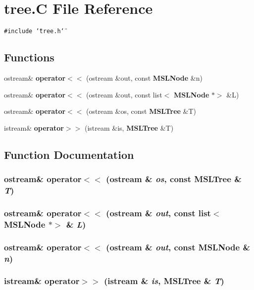 \section{tree.C File Reference}
\label{tree_C}
{\tt \#include \char`\"{}tree.h\char`\"{}}\par
\subsection*{Functions}
\begin{CompactItemize}
\item 
ostream\& {\bf operator$<$$<$} (ostream \&out, const {\bf MSLNode} \&n)
\item 
ostream\& {\bf operator$<$$<$} (ostream \&out, const list$<$ {\bf MSLNode} $\ast$$>$ \&L)
\item 
ostream\& {\bf operator$<$$<$} (ostream \&os, const {\bf MSLTree} \&T)
\item 
istream\& {\bf operator$>$$>$} (istream \&is, {\bf MSLTree} \&T)
\end{CompactItemize}


\subsection{Function Documentation}
\subsubsection{\setlength{\rightskip}{0pt plus 5cm}ostream\& operator$<$$<$ (ostream \& {\em os}, const {\bf MSLTree} \& {\em T})}\label{tree_C_a2}


\subsubsection{\setlength{\rightskip}{0pt plus 5cm}ostream\& operator$<$$<$ (ostream \& {\em out}, const list$<$ {\bf MSLNode} $\ast$$>$ \& {\em L})}\label{tree_C_a1}


\subsubsection{\setlength{\rightskip}{0pt plus 5cm}ostream\& operator$<$$<$ (ostream \& {\em out}, const {\bf MSLNode} \& {\em n})}\label{tree_C_a0}


\subsubsection{\setlength{\rightskip}{0pt plus 5cm}istream\& operator$>$$>$ (istream \& {\em is}, {\bf MSLTree} \& {\em T})}\label{tree_C_a3}


